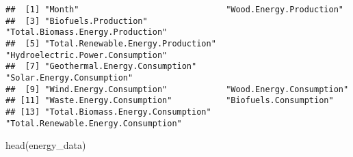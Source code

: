 \documentclass[
]{article}
\newenvironment{Shaded}{\begin{snugshade}}{\end{snugshade}}
\newcommand{\FunctionTok}[1]{\textcolor[rgb]{0.00,0.00,0.00}{#1}}
\newcommand{\NormalTok}[1]{#1}
\begin{document}
\begin{verbatim}
##  [1] "Month"                              "Wood.Energy.Production"            
##  [3] "Biofuels.Production"                "Total.Biomass.Energy.Production"   
##  [5] "Total.Renewable.Energy.Production"  "Hydroelectric.Power.Consumption"   
##  [7] "Geothermal.Energy.Consumption"      "Solar.Energy.Consumption"          
##  [9] "Wind.Energy.Consumption"            "Wood.Energy.Consumption"           
## [11] "Waste.Energy.Consumption"           "Biofuels.Consumption"              
## [13] "Total.Biomass.Energy.Consumption"   "Total.Renewable.Energy.Consumption"
\end{verbatim}

\begin{Shaded}
\begin{Highlighting}[]
\FunctionTok{head}\NormalTok{(energy\_data)}
\end{Highlighting}
\end{Shaded}
\end{document}
